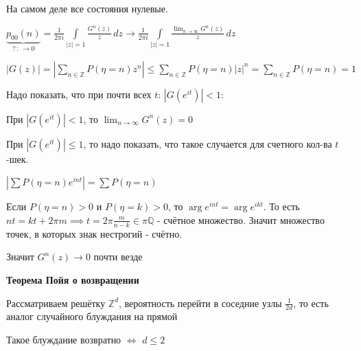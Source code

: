 \begin{remark}
    На самом деле все состояния нулевые.

    $\underbrace{p_{00} (n)}_{? \, : \, \rightarrow 0} = \frac{1}{2\pi i} \int\limits_{|z| = 1} \frac{G^n (z)}{z} \, dz \rightarrow \frac{1}{2\pi i} \int\limits_{|z| = 1} \frac{\lim_{n\to \infty} G^n (z)}{z} \, dz$

    $\left| G(z) \right| = \left| \sum\limits_{n \in \mathbb{Z}} P(\eta = n) z^n \right| \leqslant \sum\limits_{n \in \mathbb{Z}} P(\eta = n) |z|^n = \sum\limits_{n \in \mathbb{Z}} P(\eta = n) = 1$

    Надо показать, что при почти всех $t$: $|G(e^{it})| < 1$:

    При $|G(e^{it})| < 1$, то $\lim_{n \to \infty} G^n(z) = 0$

    При $|G(e^{it})| \leq 1$, то надо показать, что такое случается для счетного кол-ва $t$-шек. 

    $\left| \sum P(\eta = n) e^{int} \right| = \sum P(\eta = n)$

    Если $P(\eta = n) > 0$ и $P(\eta = k) > 0$, то $\arg e^{int} = \arg e^{ikt}$. То есть $nt = kt + 2\pi m \implies t = 2\pi \frac{m}{n - k} \in \pi \mathbb{Q}$ - счётное множество. Значит множество точек, в которых знак нестрогий - счётно.

    Значит $G^n (z) \rightarrow 0$ почти везде
\end{remark}

\begin{theorem}
    \textbf{Теорема Пойя о возвращении}

    Рассматриваем решётку $\mathbb{Z}^d$, вероятность перейти в соседние узлы $\frac{1}{2d}$, то есть аналог случайного блуждания на прямой

    Такое блуждание возвратно $\Longleftrightarrow$ $d \leqslant 2$
\end{theorem}

